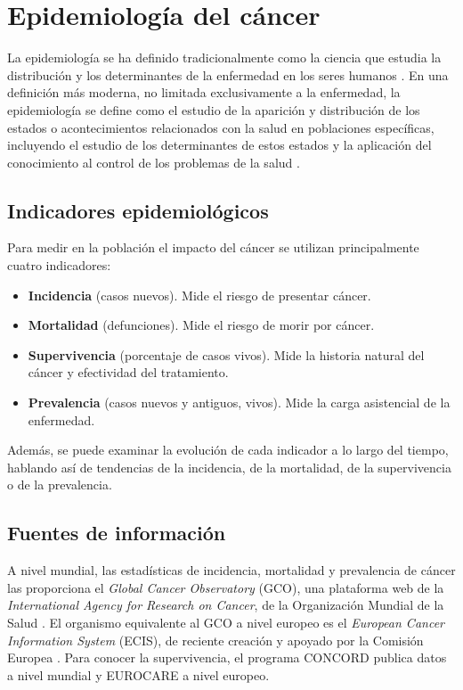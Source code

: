 \chapter{Epidemiología del cáncer}

La epidemiología se ha definido tradicionalmente como la ciencia que estudia la distribución y los determinantes de la enfermedad en los seres humanos \cite{MacMahon1970}. En una definición más moderna, no limitada exclusivamente a la enfermedad, la epidemiología se define como el estudio de la aparición y distribución de los estados o acontecimientos relacionados con la salud en poblaciones específicas, incluyendo el estudio de los determinantes de estos estados y la aplicación del conocimiento al control de los problemas de la salud \cite{Porta2008}.

\section{Indicadores epidemiológicos}

Para medir en la población el impacto del cáncer se utilizan principalmente cuatro indicadores:

\begin{itemize}
	\item \textbf{Incidencia} (casos nuevos). Mide el riesgo de presentar cáncer.
	\item \textbf{Mortalidad} (defunciones). Mide el riesgo de morir por cáncer.
	\item \textbf{Supervivencia} (porcentaje de casos vivos). Mide la historia natural del cáncer y efectividad del tratamiento.
	\item \textbf{Prevalencia} (casos nuevos y antiguos, vivos). Mide la carga asistencial de la enfermedad.
\end{itemize}

Además, se puede examinar la evolución de cada indicador a lo largo del tiempo, hablando así de tendencias de la incidencia, de la mortalidad, de la supervivencia o de la prevalencia.\\


\section{Fuentes de información}

A nivel mundial, las estadísticas de incidencia, mortalidad y prevalencia de cáncer las proporciona el \textit{Global Cancer Observatory} (GCO), una plataforma web de la \textit{International Agency for Research on Cancer}, de la Organización Mundial de la Salud \cite{Bray2018, GCO}. El organismo equivalente al GCO a nivel europeo es el \textit{European Cancer Information System} (ECIS), de reciente creación y apoyado por la Comisión Europea \cite{ECIS, ECIS2}. Para conocer la supervivencia, el programa CONCORD \cite{Allemani2018} publica datos a nivel mundial y EUROCARE \cite{DeAngelis2014} a nivel europeo.\\


